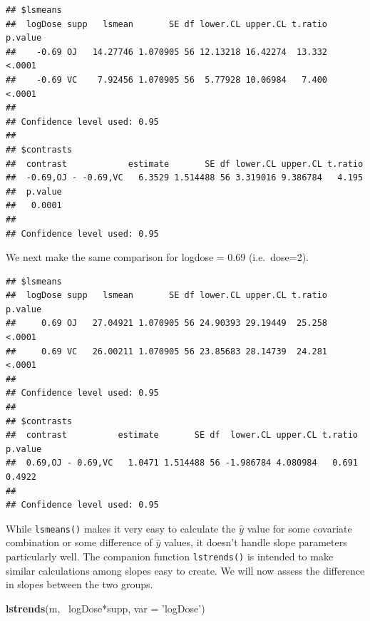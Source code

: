 \documentclass[]{book}
\newenvironment{Shaded}{\begin{snugshade}}{\end{snugshade}}
\newcommand{\KeywordTok}[1]{\textcolor[rgb]{0.13,0.29,0.53}{\textbf{{#1}}}}
\newcommand{\DataTypeTok}[1]{\textcolor[rgb]{0.13,0.29,0.53}{{#1}}}
\newcommand{\DecValTok}[1]{\textcolor[rgb]{0.00,0.00,0.81}{{#1}}}
\newcommand{\StringTok}[1]{\textcolor[rgb]{0.31,0.60,0.02}{{#1}}}
\newcommand{\OtherTok}[1]{\textcolor[rgb]{0.56,0.35,0.01}{{#1}}}
\newcommand{\NormalTok}[1]{{#1}}
\theoremstyle{definition}
\theoremstyle{definition}
\theoremstyle{remark}
\begin{document}
\begin{verbatim}
## $lsmeans
##  logDose supp   lsmean       SE df lower.CL upper.CL t.ratio p.value
##    -0.69 OJ   14.27746 1.070905 56 12.13218 16.42274  13.332  <.0001
##    -0.69 VC    7.92456 1.070905 56  5.77928 10.06984   7.400  <.0001
## 
## Confidence level used: 0.95 
## 
## $contrasts
##  contrast            estimate       SE df lower.CL upper.CL t.ratio
##  -0.69,OJ - -0.69,VC   6.3529 1.514488 56 3.319016 9.386784   4.195
##  p.value
##   0.0001
## 
## Confidence level used: 0.95
\end{verbatim}

We next make the same comparison for logdose = 0.69 (i.e.~dose=2).

\begin{Shaded}
\end{Shaded}

\begin{verbatim}
## $lsmeans
##  logDose supp   lsmean       SE df lower.CL upper.CL t.ratio p.value
##     0.69 OJ   27.04921 1.070905 56 24.90393 29.19449  25.258  <.0001
##     0.69 VC   26.00211 1.070905 56 23.85683 28.14739  24.281  <.0001
## 
## Confidence level used: 0.95 
## 
## $contrasts
##  contrast          estimate       SE df  lower.CL upper.CL t.ratio p.value
##  0.69,OJ - 0.69,VC   1.0471 1.514488 56 -1.986784 4.080984   0.691  0.4922
## 
## Confidence level used: 0.95
\end{verbatim}

While \texttt{lsmeans()} makes it very easy to calculate the \(\hat{y}\)
value for some covariate combination or some difference of \(\hat{y}\)
values, it doesn't handle slope parameters particularly well. The
companion function \texttt{lstrends()} is intended to make similar
calculations among slopes easy to create. We will now assess the
difference in slopes between the two groups.

\begin{Shaded}
\begin{Highlighting}[]
\KeywordTok{lstrends}\NormalTok{(m, ~logDose*supp, }\DataTypeTok{var =} \StringTok{'logDose'}\NormalTok{)}
\end{Highlighting}
\end{Shaded}
\end{document}
